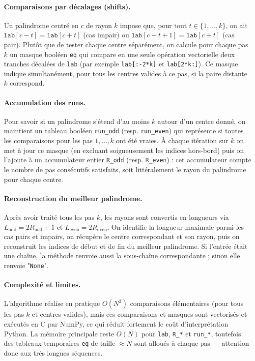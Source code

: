 \documentclass[12pt, a4paper]{article}
\begin{document}
\paragraph{Comparaisons par décalages (shifts).} Un palindrome centré en $c$ de rayon $k$ impose que, pour tout $t\in\{1,\dots,k\}$, on ait \(\texttt{lab}[c-t]=\texttt{lab}[c+t]\) (cas impair) ou \(\texttt{lab}[c-t+1]=\texttt{lab}[c+t]\) (cas pair). Plutôt que de tester chaque centre séparément, on calcule pour chaque pas $k$ un masque booléen \texttt{eq} qui compare en une seule opération vectorielle deux tranches décalées de \texttt{lab} (par exemple \texttt{lab[:-2*k]} et \texttt{lab[2*k:]}). Ce masque indique simultanément, pour tous les centres valides à ce pas, si la paire distante $k$ correspond.

\paragraph{Accumulation des runs.} Pour savoir si un palindrome s'étend d'au moins $k$ autour d'un centre donné, on maintient un tableau booléen \texttt{run\_odd} (resp. \texttt{run\_even}) qui représente si toutes les comparaisons pour les pas $1,\dots,k$ ont été vraies. À chaque itération sur $k$ on met à jour ce masque (en excluant soigneusement les indices hors-bord) puis on l'ajoute à un accumulateur entier \texttt{R\_odd} (resp. \texttt{R\_even}) : cet accumulateur compte le nombre de pas consécutifs satisfaits, soit littéralement le rayon du palindrome pour chaque centre.

\paragraph{Reconstruction du meilleur palindrome.} Après avoir traité tous les pas $k$, les rayons sont convertis en longueurs via \(L_{\text{odd}}=2R_{\text{odd}}+1\) et \(L_{\text{even}}=2R_{\text{even}}\). On identifie la longueur maximale parmi les cas pairs et impairs, on récupère le centre correspondant et son rayon, puis on reconstruit les indices de début et de fin du meilleur palindrome. Si l'entrée était une chaîne, la méthode renvoie aussi la sous-chaîne correspondante ; sinon elle renvoie "\texttt{None}".

\paragraph{Complexité et limites.} L'algorithme réalise en pratique $O(N^2)$ comparaisons élémentaires (pour tous les pas $k$ et centres valides), mais ces comparaisons et masques sont vectorisés et exécutés en C par NumPy, ce qui réduit fortement le coût d'interprétation Python. La mémoire principale reste $O(N)$ pour \texttt{lab}, \texttt{R\_*} et \texttt{run\_*}, toutefois des tableaux temporaires \texttt{eq} de taille $\approx N$ sont alloués à chaque pas — attention donc aux très longues séquences.
\end{document}
